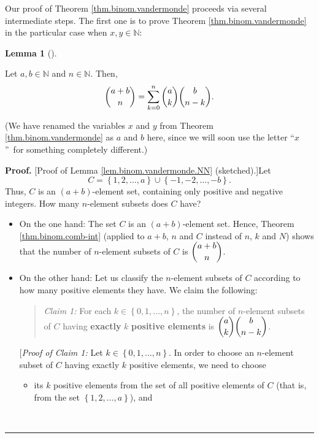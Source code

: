 \documentclass[numbers=enddot,12pt,final,onecolumn,notitlepage]{scrartcl}%
\numberwithin{exer}{subsection}
\theoremstyle{definition}
\newtheorem{lem}[theo]{Lemma}
\newenvironment{lemma}[1][]
{\begin{lem}[#1]\begin{leftbar}}
{\end{leftbar}\end{lem}}
\newenvironment{statement}{\begin{quote}}{\end{quote}}
\newenvironment{proof}[1][Proof]{\noindent\textbf{#1.} }{\ \rule{0.5em}{0.5em}}
\let\sumnonlimits\sum
\renewcommand{\sum}{\sumnonlimits\limits}
\begin{document}
Our proof of Theorem \ref{thm.binom.vandermonde} proceeds via several
intermediate steps. The first one is to prove Theorem
\ref{thm.binom.vandermonde} in the particular case when $x,y\in\mathbb{N}$:

\begin{lemma}
\label{lem.binom.vandermonde.NN}Let $a,b\in\mathbb{N}$ and $n\in\mathbb{N}$.
Then,%
\[
\dbinom{a+b}{n}=\sum_{k=0}^{n}\dbinom{a}{k}\dbinom{b}{n-k}.
\]

\end{lemma}

(We have renamed the variables $x$ and $y$ from Theorem
\ref{thm.binom.vandermonde} as $a$ and $b$ here, since we will soon use the
letter \textquotedblleft$x$\textquotedblright\ for something completely different.)

\begin{proof}
[Proof of Lemma \ref{lem.binom.vandermonde.NN} (sketched).]Let%
\[
C=\left\{  1,2,\ldots,a\right\}  \cup\left\{  -1,-2,\ldots,-b\right\}  .
\]
Thus, $C$ is an $\left(  a+b\right)  $-element set, containing only positive
and negative integers. How many $n$-element subsets does $C$ have?

\begin{itemize}
\item On the one hand: The set $C$ is an $\left(  a+b\right)  $-element set.
Hence, Theorem \ref{thm.binom.comb-int} (applied to $a+b$, $n$ and $C$ instead
of $n$, $k$ and $N$) shows that the number of $n$-element subsets of $C$ is
$\dbinom{a+b}{n}$.

\item On the other hand: Let us classify the $n$-element subsets of $C$
according to how many positive elements they have. We claim the following:

\begin{statement}
\textit{Claim 1:} For each $k\in\left\{  0,1,\ldots,n\right\}  $, the number
of $n$-element subsets of $C$ having \textbf{exactly }$k$ \textbf{positive
elements} is $\dbinom{a}{k}\dbinom{b}{n-k}$.
\end{statement}

[\textit{Proof of Claim 1:} Let $k\in\left\{  0,1,\ldots,n\right\}  $. In
order to choose an $n$-element subset of $C$ having exactly $k$ positive
elements, we need to choose

\begin{itemize}
\item its $k$ positive elements from the set of all positive elements of $C$
(that is, from the set $\left\{  1,2,\ldots,a\right\}  $), and


\end{itemize}
\end{itemize}
\end{proof}
\end{document}
